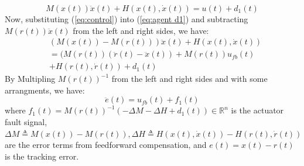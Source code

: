 \documentclass{ieeeaccess}
\newtheorem{remark}{Remark}
\begin{document}
\begin{equation} \label{eq:agent d1} 
    M(x(t))\ddot{x}(t) + H(x(t),\dot{x}(t)) = u(t) + d_1(t)
\end{equation}
Now, substituting (\ref{eq:control}) into (\ref{eq:agent d1}) and subtracting $M(r(t))\ddot{x}(t)$ from the left and right sides, we have:
\begin{equation} \label{eq:agent1}
    \begin{split}
        & (M(x(t))-M(r(t)))\ddot{x}(t) + H(x(t),\dot{x}(t)) \\
        & =(M(r(t))(\ddot{r}(t)-\ddot{x}(t)) + M(r(t))u_{fb}(t) \\
        & + H(r(t),\dot{r}(t)) + d_1(t)
    \end{split}
\end{equation}
By Multipling $M(r(t))^{-1}$ from the left and right sides and with some arrangments, we have:
\begin{equation} \label{eq:error, state eq}
    \ddot{e}(t) = u_{fb}(t) + f_1(t)
\end{equation}
where $f_1(t) = M(r(t))^{-1}(-\Delta M -\Delta H + d_1(t))\in\mathbb{R}^n$ is the actuator fault signal, $\Delta M \triangleq M(x(t)) - M(r(t)), \Delta H \triangleq H(x(t),\dot{x}(t)) - H(r(t),\dot{r}(t))$ are the error terms from feedforward compensation, and $e(t)= x(t)-r(t)$ is the tracking error.
\end{document}
